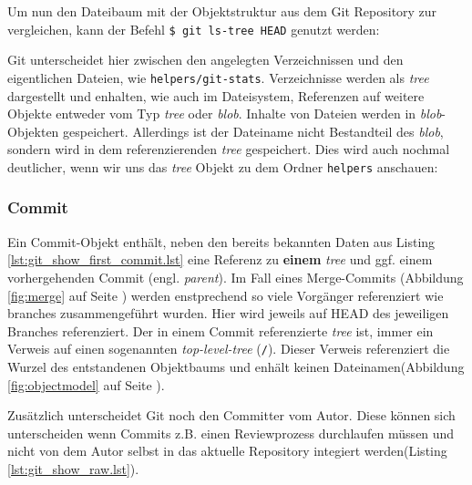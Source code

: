 

Um nun den Dateibaum mit der Objektstruktur aus dem Git Repository zur
vergleichen, kann der Befehl \texttt{\$ git ls-tree HEAD} genutzt werden:



Git unterscheidet hier zwischen den angelegten Verzeichnissen und den
eigentlichen Dateien, wie \texttt{helpers/git-stats}. Verzeichnisse werden als
\textit{tree} dargestellt und enhalten, wie auch im Dateisystem, Referenzen auf
weitere Objekte entweder vom Typ \textit{tree} oder \textit{blob}.  Inhalte von
Dateien werden in \textit{blob}-Objekten gespeichert. Allerdings ist der
Dateiname nicht Bestandteil des \textit{blob}, sondern wird in dem
referenzierenden \textit{tree} gespeichert. Dies wird auch nochmal deutlicher,
wenn wir uns das \textit{tree} Objekt zu dem Ordner \texttt{helpers} anschauen:



\subsubsection{Commit}\label{sec:commitobject}
Ein Commit-Objekt enthält, neben den bereits bekannten Daten aus Listing
\ref{lst:git_show_first_commit.lst} eine Referenz zu \textbf{einem}
\textit{tree} und ggf. einem vorhergehenden Commit (engl.  \textit{parent}). Im Fall
eines Merge-Commits (Abbildung \ref{fig:merge} auf Seite \pageref{fig:merge})
werden enstprechend so viele Vorgänger referenziert wie branches
zusammengeführt wurden. Hier wird jeweils auf \gls{HEAD} des jeweiligen
Branches referenziert. Der in einem Commit referenzierte \textit{tree} ist,
immer ein Verweis auf einen sogenannten \textit{top-level-tree} (\texttt{/}).
Dieser Verweis referenziert die Wurzel des entstandenen Objektbaums und enhält
keinen Dateinamen(Abbildung \ref{fig:objectmodel} auf Seite \pageref{fig:objectmodel}). 



Zusätzlich unterscheidet Git noch den Committer vom Autor. Diese können sich
unterscheiden wenn Commits z.B. einen Reviewprozess durchlaufen müssen und
nicht von dem Autor selbst in das aktuelle Repository integiert werden(Listing
\ref{lst:git_show_raw.lst}). 

